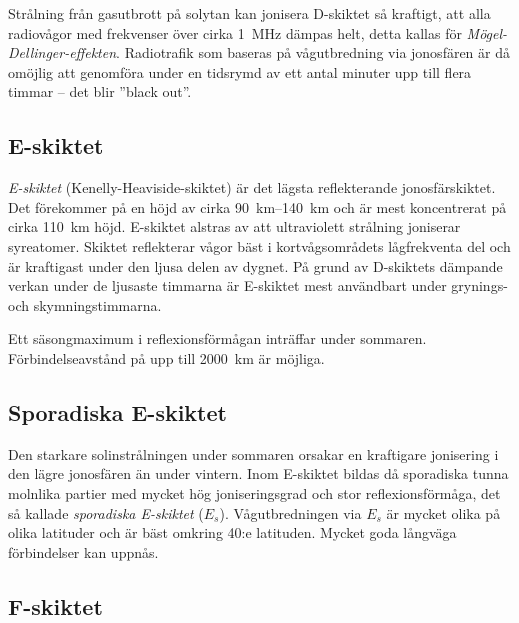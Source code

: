 Strålning från gasutbrott på solytan kan jonisera D-skiktet så kraftigt, att
alla radiovågor med frekvenser över cirka \SI{1}{\mega\hertz} dämpas helt,
detta kallas för \emph{Mögel-Dellinger-effekten}.
Radiotrafik som baseras på vågutbredning via jonosfären är då
omöjlig att genomföra under en tidsrymd av ett antal minuter upp till
flera timmar -- det blir ''black out''.

\subsection{E-skiktet}
\label{e-skiktet}

\emph{E-skiktet} (Kenelly-Heaviside-skiktet) är det lägsta reflekterande
jonosfärskiktet.
Det förekommer på en höjd av cirka \SIrange{90}{140}{\kilo\metre} och är mest
koncentrerat på cirka \SI{110}{\kilo\metre} höjd.
E-skiktet alstras av att ultraviolett strålning joniserar syreatomer.
Skiktet reflekterar vågor bäst i kortvågsområdets lågfrekventa del och är
kraftigast under den ljusa delen av dygnet.
På grund av D-skiktets dämpande verkan under de ljusaste timmarna är E-skiktet
mest användbart under grynings- och skymningstimmarna.

Ett säsongmaximum i reflexionsförmågan inträffar under sommaren.
Förbindelseavstånd på upp till \SI{2000}{\kilo\metre} är möjliga.

\subsection{Sporadiska E-skiktet}
\label{sporadiskt_e}

Den starkare solinstrålningen under sommaren orsakar en kraftigare
jonisering i den lägre jonosfären än under vintern.
Inom E-skiktet bildas då sporadiska tunna molnlika partier med mycket hög
joniseringsgrad och stor reflexionsförmåga, det så kallade \emph{sporadiska
E-skiktet} (\(E_s\)).
Vågutbredningen via \(E_s\) är mycket olika på olika latituder och är bäst
omkring 40:e latituden.
Mycket goda långväga förbindelser kan uppnås.


\subsection{F-skiktet}

